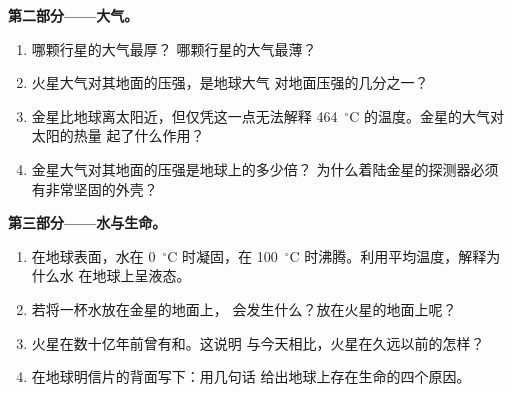 \begin{problem}
\medskip
\noindent\textbf{第二部分——大气。}
\begin{enumerate}[resume]
  \item 哪颗行星的大气最厚？
        哪颗行星的大气最薄？
  \item 火星大气对其地面的压强，是地球大气
        对地面压强的几分之一？
  \item 金星比地球离太阳近，但仅凭这一点无法解释
        464~$^\circ$C 的温度。金星的大气对太阳的热量
        起了什么作用？
  \item 金星大气对其地面的压强是地球上的多少倍？
        为什么着陆金星的探测器必须有非常坚固的外壳？
\end{enumerate}

\medskip
\noindent\textbf{第三部分——水与生命。}
\begin{enumerate}[resume]
  \item 在地球表面，水在 0~$^\circ$C 时凝固，在
        100~$^\circ$C 时沸腾。利用平均温度，解释为什么水
        在地球上呈液态。
  \item 若将一杯水放在金星的地面上，
        会发生什么？放在火星的地面上呢？
  \item 火星在数十亿年前曾有和。这说明
        与今天相比，火星在久远以前的怎样？
  \item 在地球明信片的背面写下：用几句话
        给出地球上存在生命的四个原因。
\end{enumerate}
\end{problem}
